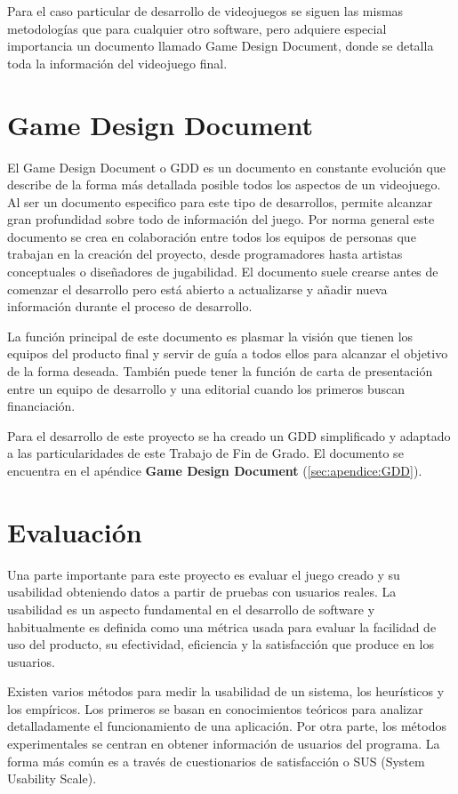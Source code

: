 Para el caso particular de desarrollo de videojuegos se siguen las mismas metodologías que para cualquier otro software, pero adquiere especial importancia un documento llamado Game Design Document, donde se detalla toda la información del videojuego final.

\section{Game Design Document}

El Game Design Document o GDD es un documento en constante evolución que describe de la forma más detallada posible todos los aspectos de un videojuego. Al ser un documento especifico para este tipo de desarrollos, permite alcanzar gran profundidad sobre todo de información del juego.  Por norma general este documento se crea en colaboración entre todos los equipos de personas que trabajan en la creación del proyecto, desde programadores hasta artistas conceptuales o diseñadores de jugabilidad. El documento suele crearse antes de comenzar el desarrollo pero está abierto a actualizarse y añadir nueva información durante el proceso de desarrollo.

La función principal de este documento es plasmar la visión que tienen los equipos del producto final y servir de guía a todos ellos para alcanzar el objetivo de la forma deseada. También puede tener la función de carta de presentación entre un equipo de desarrollo y una editorial cuando los primeros buscan financiación.

Para el desarrollo de este proyecto se ha creado un GDD simplificado y adaptado a las particularidades de este Trabajo de Fin de Grado. El documento se encuentra en el apéndice \textbf{Game Design Document} (\ref{sec:apendice:GDD}).

\section{Evaluación}

Una parte importante para este proyecto es evaluar el juego creado y su usabilidad obteniendo datos a partir de pruebas con usuarios reales. La usabilidad es un aspecto fundamental en el desarrollo de software y habitualmente es definida como una métrica usada para evaluar la facilidad de uso del producto, su efectividad, eficiencia y la satisfacción que produce en los usuarios. \cite{MU_eval_usabilidad}

Existen varios métodos para medir la usabilidad de un sistema, los heurísticos y los empíricos. Los primeros se basan en conocimientos teóricos para analizar detalladamente el funcionamiento de una aplicación. Por otra parte, los métodos experimentales se centran en obtener información de usuarios del programa. La forma más común es a través de cuestionarios de satisfacción o SUS (System Usability Scale).

